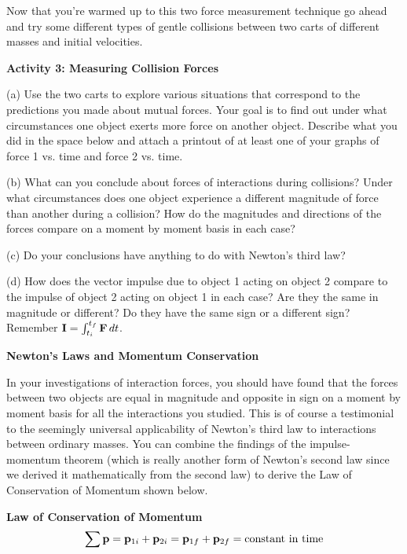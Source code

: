 Now that you're warmed up to this two force measurement technique go ahead and
try some different types of gentle collisions between two carts of different
masses and initial velocities.

\textbf{Activity 3: Measuring Collision Forces }

(a) Use the two carts to explore various situations that correspond to the predictions
you made about mutual forces. Your goal is to find out under what circumstances
one object exerts more force on another object. Describe what you did in the
space below and attach a printout of at least one of your graphs of force 1
vs. time and force 2 vs. time.
\vspace{40mm}

(b) What can you conclude about forces of interactions during collisions? Under
what circumstances does one object experience a different magnitude of force
than another during a collision? How do the magnitudes and directions of the
forces compare on a moment by moment basis in each case? 
\vspace{30mm}

(c) Do your conclusions have anything to do with Newton's third law?
\vspace{20mm}

(d) How does the vector impulse due to object 1 acting on object 2 compare to
the impulse of object 2 acting on object 1 in each case? Are they the same in
magnitude or different? Do they have the same sign or a different sign? Remember
\( {\bf I}=\int _{t_{i}}^{t_{f}}{\bf F}\,dt \).
\vspace{30mm}

\textbf{Newton's Laws and Momentum Conservation} 

In your investigations of interaction forces, you should have found that the
forces between two objects are equal in magnitude and opposite in sign on a
moment by moment basis for all the interactions you studied. This is of course
a testimonial to the seemingly universal applicability of Newton's third law
to interactions between ordinary masses. You can combine the findings of the
impulse-momentum theorem (which is really another form of Newton's second law
since we derived it mathematically from the second law) to derive the Law of
Conservation of Momentum shown below.

{\par\centering \textbf{Law of Conservation of Momentum}
\[
\sum {\bf p}={{\bf p}_{1i}}+{{\bf p}_{2i}}={{\bf p}_{1f}}+{{\bf p}_{2f}}=
\mbox{constant in time}\]
\par}

